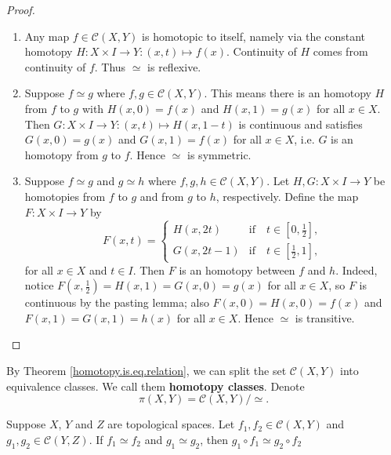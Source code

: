 \begin{proof}
\begin{enumerate}[label=(\roman*)] 
    \item Any map \(f\in \mathcal{C}(X,Y)\) is homotopic to itself, namely via the constant homotopy \(H\colon X\times I \to Y: (x,t)\mapsto f(x)\). Continuity of \(H\) comes from continuity of \(f\). Thus \(\simeq\) is reflexive.
    \item  Suppose \(f\simeq g\) where \(f,g\in \mathcal{C}(X,Y)\). This means  there is an homotopy \(H\) from \(f\) to \(g\) with \(H(x,0) =  f(x)\) and \(H(x,1) =  g(x)\) for all \(x\in X\). Then \(G\colon X\times I \to Y: (x,t)\mapsto H(x,1-t)\) is continuous  and satisfies \(G(x,0) = g(x)\) and \(G(x,1) = f(x)\) for all \(x\in X\), i.e. \(G\) is an homotopy from \(g\) to \(f\). Hence \(\simeq\) is symmetric.
    \item Suppose \(f\simeq g\) and \(g\simeq h\) where \(f,g,h\in \mathcal{C}(X,Y)\). Let \(H,G\colon X\times I\to Y\) be homotopies from \(f\) to \(g\) and from \(g\) to \(h\), respectively. Define the map \(F\colon X\times I \to  Y\) by \[
        F(x,t) = \begin{cases}
            H(x,2t)     & \text{if}\quad t\in [0,\frac{1}{2}],\\
            G(x,2t -1)  & \text{if}\quad t\in [\frac{1}{2},1],
        \end{cases}
    \] for all \(x\in X\) and \(t\in I\). Then \(F\) is an homotopy between \(f\) and \(h\). Indeed, notice \(F(x,\frac{1}{2})= H(x,1)=G(x,0)=g(x)\) for all \(x\in X\), so  \(F\) is continuous by the pasting lemma; also \(F(x,0) = H(x,0)= f(x)\) and \(F(x,1) =G(x,1)= h(x)\) for all \(x\in X\). Hence \(\simeq\) is transitive.
\end{enumerate}
\end{proof}


By Theorem \ref{homotopy.is.eq.relation}, we can split the set  \(\mathcal{C}(X,Y)\) into equivalence classes. We call them \textbf{homotopy classes}. Denote  \[\pi(X,Y) = \mathcal{C}(X,Y) / \simeq.\] 

\begin{theorem}
    Suppose \(X\), \(Y\) and \(Z\) are topological spaces. Let 
     \(f_1, f_2 \in \mathcal{C}(X,Y)\) and \(g_1, g_2 \in \mathcal{C}(Y, Z)\). If \(f_1 \simeq f_2\) and \(g_1 \simeq g_2\), then \(g_1 \circ f_1 \simeq g_2\circ f_2\)
\end{theorem}

